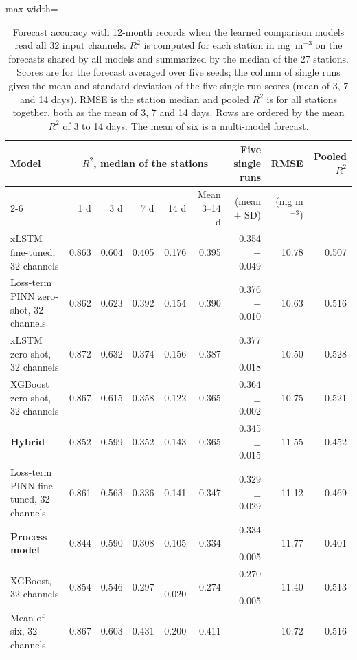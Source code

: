\begin{table}[tbp]
\centering
\caption{Forecast accuracy with 12-month records when the learned comparison models read all 32 input channels. $R^2$ is computed for each station in mg~m$^{-3}$ on the forecasts shared by all models and summarized by the median of the 27 stations. Scores are for the forecast averaged over five seeds; the column of single runs gives the mean and standard deviation of the five single-run scores (mean of 3, 7 and 14 days). RMSE is the station median and pooled $R^2$ is for all stations together, both as the mean of 3, 7 and 14 days. Rows are ordered by the mean $R^2$ of 3 to 14 days. The mean of six is a multi-model forecast.}
\label{tab:S_accuracy32_12}
\footnotesize
\setlength{\tabcolsep}{4pt}
\begin{adjustbox}{max width=\textwidth}
\begin{tabular}{lrrrrrrrr}
\toprule
Model & \multicolumn{5}{c}{$R^2$, median of the stations} & Five single runs & RMSE & Pooled $R^2$ \\ \cmidrule(lr){2-6}
 & 1 d & 3 d & 7 d & 14 d & Mean 3--14 d & (mean $\pm$ SD) & (mg m$^{-3}$) & \\
\midrule
xLSTM fine-tuned, 32 channels & 0.863 & 0.604 & 0.405 & 0.176 & 0.395 & 0.354 $\pm$ 0.049 & 10.78 & 0.507 \\
Loss-term PINN zero-shot, 32 channels & 0.862 & 0.623 & 0.392 & 0.154 & 0.390 & 0.376 $\pm$ 0.010 & 10.63 & 0.516 \\
xLSTM zero-shot, 32 channels & 0.872 & 0.632 & 0.374 & 0.156 & 0.387 & 0.377 $\pm$ 0.018 & 10.50 & 0.528 \\
XGBoost zero-shot, 32 channels & 0.867 & 0.615 & 0.358 & 0.122 & 0.365 & 0.364 $\pm$ 0.002 & 10.75 & 0.521 \\
\textbf{Hybrid} & 0.852 & 0.599 & 0.352 & 0.143 & 0.365 & 0.345 $\pm$ 0.015 & 11.55 & 0.452 \\
Loss-term PINN fine-tuned, 32 channels & 0.861 & 0.563 & 0.336 & 0.141 & 0.347 & 0.329 $\pm$ 0.029 & 11.12 & 0.469 \\
\textbf{Process model} & 0.844 & 0.590 & 0.308 & 0.105 & 0.334 & 0.334 $\pm$ 0.005 & 11.77 & 0.401 \\
XGBoost, 32 channels & 0.854 & 0.546 & 0.297 & $-$0.020 & 0.274 & 0.270 $\pm$ 0.005 & 11.40 & 0.513 \\
\midrule
Mean of six, 32 channels & 0.867 & 0.603 & 0.431 & 0.200 & 0.411 & -- & 10.72 & 0.516 \\
\bottomrule
\end{tabular}
\end{adjustbox}
\end{table}
